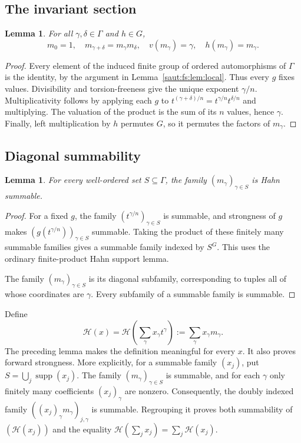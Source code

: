 \documentclass[11pt]{article}
\newtheorem{lemma}[theorem]{Lemma}
\theoremstyle{definition}
\theoremstyle{remark}
\newcommand{\supp}{\operatorname{supp}}
\numberwithin{equation}{section}
\begin{document}
\subsection{The invariant section}

\begin{lemma}\label{saut:fs:lem:section}
For all $\gamma,\delta\in\Gamma$ and $h\in G$,
\[
 m_0=1,\quad m_{\gamma+\delta}=m_\gamma m_\delta,
 \quad v(m_\gamma)=\gamma,\quad h(m_\gamma)=m_\gamma.
\]
\end{lemma}
\begin{proof}
Every element of the induced finite group of ordered automorphisms of $\Gamma$ is
the identity, by the argument in Lemma~\ref{saut:fs:lem:local}. Thus every $g$ fixes
values. Divisibility and torsion-freeness give the unique exponent $\gamma/n$.
Multiplicativity follows by applying each $g$ to
$t^{(\gamma+\delta)/n}=t^{\gamma/n}t^{\delta/n}$ and multiplying. The valuation of
the product is the sum of its $n$ values, hence $\gamma$. Finally, left
multiplication by $h$ permutes $G$, so it permutes the factors of $m_\gamma$.
\end{proof}

\subsection{Diagonal summability}

\begin{lemma}\label{saut:fs:lem:diagonal}
For every well-ordered set $S\subseteq\Gamma$, the family $(m_\gamma)_{\gamma\in S}$
is Hahn summable.
\end{lemma}
\begin{proof}
For a fixed $g$, the family $(t^{\gamma/n})_{\gamma\in S}$ is summable, and
strongness of $g$ makes $(g(t^{\gamma/n}))_{\gamma\in S}$ summable. Taking the
product of these finitely many summable families gives a summable family indexed by
$S^G$. This uses the ordinary finite-product Hahn support lemma.

The family $(m_\gamma)_{\gamma\in S}$ is its diagonal subfamily, corresponding to
tuples all of whose coordinates are $\gamma$. Every subfamily of a summable family is
summable.
\end{proof}

Define
\begin{equation}\label{saut:fs:eq:H-definition}
 \mathcal H(x)=\mathcal H\left(\sum_\gamma x_\gamma t^\gamma\right)
 :=\sum_\gamma x_\gamma m_\gamma.
\end{equation}
The preceding lemma makes the definition meaningful for every $x$. It also proves
forward strongness. More explicitly, for a summable family $(x_j)$, put
$S=\bigcup_j\supp(x_j)$. The family $(m_\gamma)_{\gamma\in S}$ is summable, and for
each $\gamma$ only finitely many coefficients $(x_j)_\gamma$ are nonzero.
Consequently, the doubly indexed family $((x_j)_\gamma m_\gamma)_{j,\gamma}$ is
summable. Regrouping it proves both summability of $(\mathcal H(x_j))$ and the
equality $\mathcal H(\sum_jx_j)=\sum_j\mathcal H(x_j)$.
\end{document}

